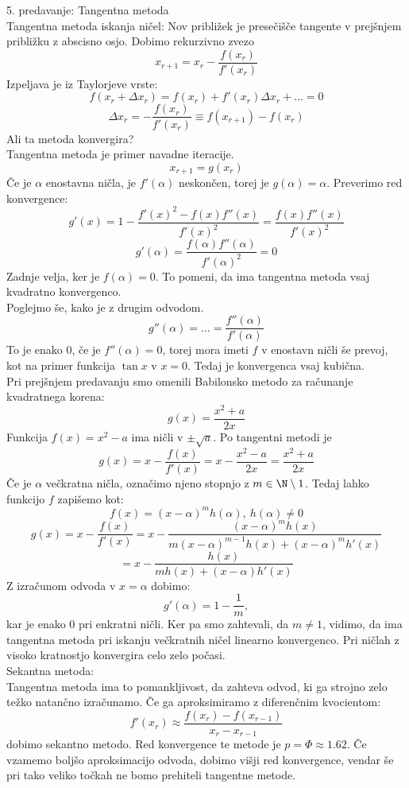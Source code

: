 \documentclass[a4paper]{article}
\begin{document}
5. predavanje: Tangentna metoda \\[4mm]
Tangentna metoda iskanja ničel: Nov približek je presečišče tangente v prejšnjem približku z abscisno osjo. Dobimo rekurzivno zvezo
$$x_{r+1} = x_r - \frac{f(x_r)}{f'(x_r)}$$
Izpeljava je iz Taylorjeve vrste:
$$f(x_r + \Delta x_r) = f(x_r) + f'(x_r) \Delta x_r + ... = 0$$
$$\Delta x_r = - \frac{f(x_r)}{f'(x_r)} \equiv f(x_{r+1}) - f(x_r)$$
Ali ta metoda konvergira? \\
Tangentna metoda je primer navadne iteracije.
\begin{displaymath}
    x_{r+1} = g(x_r)
\end{displaymath}
Če je $\alpha$ enostavna ničla, je $f'(\alpha)$ neskončen, torej je $g(\alpha) = \alpha$.
Preverimo red konvergence:
$$g'(x) = 1 - \frac{f'(x)^2 - f(x)f''(x)}{f'(x)^2} = \frac{f(x)f''(x)}{f'(x)^2}$$
$$g'(\alpha) = \frac{f(\alpha)f''(\alpha)}{f'(\alpha)^2} = 0$$
Zadnje velja, ker je $f(\alpha) = 0$. To pomeni, da ima tangentna metoda vsaj kvadratno konvergenco. \\
Poglejmo še, kako je z drugim odvodom.
$$g''(\alpha) = ... = \frac{f''(\alpha)}{f'(\alpha)}$$
To je enako 0, če je $f''(\alpha) = 0$, torej mora imeti $f$ v enostavn ničli še prevoj, kot na primer funkcija $\tan x$ v $x = 0$. Tedaj je konvergenca vsaj kubična. \\[3mm]
Pri prejšnjem predavanju smo omenili Babilonsko metodo za računanje kvadratnega korena: $$g(x) = \frac{x^2 + a}{2x}$$
Funkcija $f(x) = x^2 - a$ ima ničli v $\displaystyle{\pm \sqrt{a}}$.
Po tangentni metodi je \begin{displaymath}
    g(x) = x - \frac{f(x)}{f'(x)} = x - \frac{x^2 - a}{2x} = \frac{x^2 + a}{2x}
\end{displaymath}
Če je $\alpha$ večkratna ničla, označimo njeno stopnjo z $m\in\N \setminus {1}$. Tedaj lahko funkcijo $f$ zapišemo kot:
$$f(x) = \left(x - \alpha\right)^mh(\alpha),~h(\alpha)\neq0$$
$$g(x) = x - \frac{f(x)}{f'(x)} = x - \frac{\left(x - \alpha\right)^mh(x)}{m\left(x-\alpha\right)^{m-1}h(x) + \left(x - \alpha\right)^mh'(x)}$$
$$= x - \frac{h(x)}{mh(x) + \left(x-\alpha\right)h'(x)}$$
Z izračunom odvoda v $x = \alpha$ dobimo:
$$g'(\alpha) = 1 - \frac{1}{m},$$
kar je enako 0 pri enkratni ničli. Ker pa smo zahtevali, da $m \neq 1$, vidimo, da ima tangentna metoda pri iskanju večkratnih
ničel linearno konvergenco. Pri ničlah z visoko kratnostjo konvergira celo zelo počasi. \\

Sekantna metoda: \\
Tangentna metoda ima to pomankljivost, da zahteva odvod, ki ga strojno zelo težko natančno izračunamo. Če ga aproksimiramo z diferenčnim kvocientom:
$$f'(x_r) \approx \frac{f(x_r) - f(x_{r-1})}{x_r - x_{r-1}}$$
dobimo sekantno metodo. Red konvergence te metode je $p = \Phi \approx 1.62$.
Če vzamemo boljšo aproksimacijo odvoda, dobimo višji red konvergence, vendar še pri tako veliko točkah ne bomo prehiteli tangentne metode. \\
\end{document}
